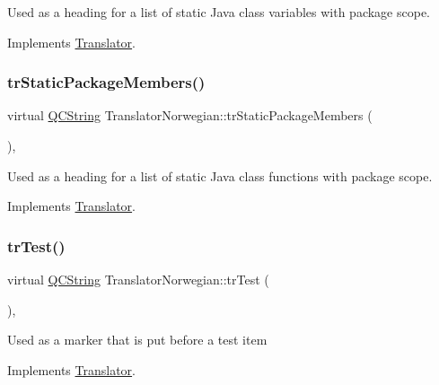 Used as a heading for a list of static Java class variables with package scope. 

Implements \mbox{\hyperlink{class_translator}{Translator}}.

\mbox{\label{class_translator_norwegian_a5a8d794eacb67225bea8b4bf892a4d38}} 
\subsubsection{\texorpdfstring{trStaticPackageMembers()}{trStaticPackageMembers()}}
{\footnotesize\ttfamily virtual \mbox{\hyperlink{class_q_c_string}{Q\+C\+String}} Translator\+Norwegian\+::tr\+Static\+Package\+Members (\begin{DoxyParamCaption}{ }\end{DoxyParamCaption})\hspace{0.3cm}{\ttfamily [inline]}, {\ttfamily [virtual]}}

Used as a heading for a list of static Java class functions with package scope. 

Implements \mbox{\hyperlink{class_translator}{Translator}}.

\mbox{\label{class_translator_norwegian_aba6cffeb4e885992b737208fec03e753}} 
\subsubsection{\texorpdfstring{trTest()}{trTest()}}
{\footnotesize\ttfamily virtual \mbox{\hyperlink{class_q_c_string}{Q\+C\+String}} Translator\+Norwegian\+::tr\+Test (\begin{DoxyParamCaption}{ }\end{DoxyParamCaption})\hspace{0.3cm}{\ttfamily [inline]}, {\ttfamily [virtual]}}

Used as a marker that is put before a test item 

Implements \mbox{\hyperlink{class_translator}{Translator}}.

\mbox{\label{class_translator_norwegian_ad5130914a116936a9248503ee9e6a140}} 
